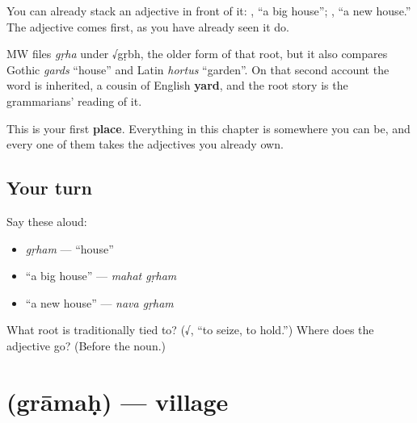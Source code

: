 You can already stack an adjective in front of it:  , \textquotedblleft{}a big house\textquotedblright{};  , \textquotedblleft{}a new house.\textquotedblright{} The adjective comes first, as you have already seen it do.

\begin{cousinweb}
MW files \emph{gṛha} under √gṛbh, the older form of that root, but it also compares Gothic \emph{gards} \textquotedblleft{}house\textquotedblright{} and Latin \emph{hortus} \textquotedblleft{}garden\textquotedblright{}. On that second account the word is inherited, a cousin of English \textbf{yard}, and the root story is the grammarians' reading of it.
\end{cousinweb}

\begin{grammarlens}[title={What you've built}]
This is your first \textbf{place}. Everything in this chapter is somewhere you can be, and every one of them takes the adjectives you already own.
\end{grammarlens}

\subsection*{Your turn}
Say these aloud:

\begin{itemize}
\raggedright
  \item \emph{gṛham} — \textquotedblleft{}house\textquotedblright{}
  \item \textquotedblleft{}a big house\textquotedblright{} — \emph{mahat gṛham}
  \item \textquotedblleft{}a new house\textquotedblright{} — \emph{nava gṛham}
\end{itemize}

\begin{tcolorbox}[breakable,colback=teal!4,colframe=teal!35!black,title={Before you move on}]
What root is  traditionally tied to? (√, \textquotedblleft{}to seize, to hold.\textquotedblright{}) Where does the adjective go? (Before the noun.)
\end{tcolorbox}
\section[\texorpdfstring{\sk{ग्रामः} (grāmaḥ)}{ग्रामः (grāmaḥ)}]{ (grāmaḥ) — village}

\label{lesson:SA-C16-village}



